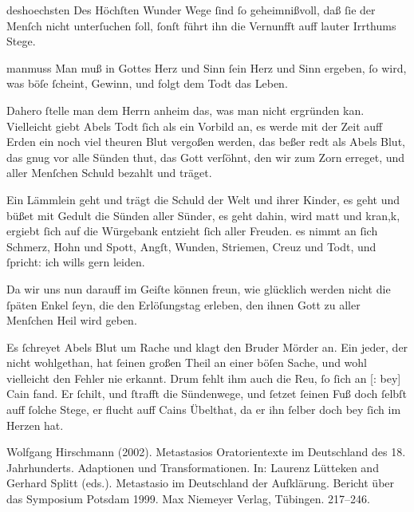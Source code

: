 \documentclass[tocstyle=ref-genre]{ees}
\begin{document}
{\begin{movement}{deshoechsten}
  \voice[Adam]
  Des Höchſten Wunder Wege
  ſind ſo geheimnißvoll,
  daß ſie der Menſch nicht unterſuchen ſoll,
  ſonſt führt ihn die Vernunfft auff lauter Irrthums Stege.
\end{movement}

\begin{movement}{manmuss}
  \voice[Chor]
  Man muß in Gottes Herz und Sinn
  ſein Herz und Sinn ergeben,
  ſo wird, was böſe ſcheint, Gewinn,
  und folgt dem Todt das Leben.
\end{movement}

\begin{movement}{}
  \voice[Adam]
  Dahero ſtelle man dem Herrn anheim
  das, was man nicht ergründen kan.
  Vielleicht giebt Abels Todt ſich als ein Vorbild an,
  es werde mit der Zeit auff Erden
  ein noch viel theuren Blut vergoßen werden,
  das beßer redt als Abels Blut,
  das gnug vor alle Sünden thut,
  das Gott verſöhnt, den wir zum Zorn erreget,
  und aller Menſchen Schuld bezahlt und träget.
\end{movement}

\begin{movement}{}
  \voice[Chor]
  Ein Lämmlein geht und trägt die Schuld
  der Welt und ihrer Kinder,
  es geht und büßet mit Gedult
  die Sünden aller Sünder,
  es geht dahin, wird matt und kran,k,
  ergiebt ſich auf die Würgebank
  entzieht ſich aller Freuden.
  es nimmt an ſich Schmerz, Hohn und Spott,
  Angſt, Wunden, Striemen, Creuz und Todt,
  und ſpricht: ich wills gern leiden.
\end{movement}

\begin{movement}{}
  \voice[Adam]
  Da wir uns nun darauff im Geiſte können freun,
  wie glücklich werden nicht die ſpäten Enkel ſeyn,
  die den Erlöſungstag erleben,
  den ihnen Gott
  zu aller Menſchen Heil wird geben.
\end{movement}

\begin{movement}{}
  \voice[Chor]
  Es ſchreyet Abels Blut um Rache
  und klagt den Bruder Mörder an.
  Ein jeder, der nicht wohlgethan,
  hat ſeinen großen Theil an einer böſen Sache,
  und wohl vielleicht den Fehler nie erkannt.
  Drum fehlt ihm auch die Reu, ſo ſich an [: bey] Cain fand.
  Er ſchilt, und ſtrafft die Sündenwege,
  und ſetzet ſeinen Fuß doch ſelbſt auff ſolche Stege,
  er flucht auff Cains Übelthat,
  da er ihn ſelber doch bey ſich im Herzen hat.
\end{movement}
}

\eesScore

Wolfgang Hirschmann (2002). Metastasios Oratorientexte im Deutschland des 18. Jahrhunderts. Adaptionen und Transformationen. In: Laurenz Lütteken and Gerhard Splitt (eds.). Metastasio im Deutschland der Aufklärung. Bericht über das Symposium Potsdam 1999. Max Niemeyer Verlag, Tübingen. 217–246.
\end{document}
